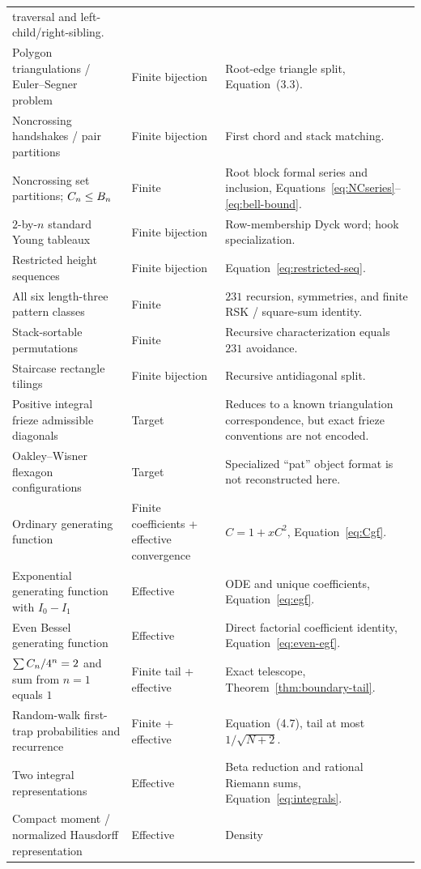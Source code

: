 \begin{longtable}{@{}p{}p{}p{}@{}}
traversal and left-child/right-sibling.\\
Polygon triangulations / Euler--Segner problem & Finite bijection & Root-edge
triangle split, Equation~(3.3).\\
Noncrossing handshakes / pair partitions & Finite bijection & First chord and
stack matching.\\
Noncrossing set partitions; $C_n\le B_n$ & Finite & Root block formal
series and inclusion, Equations~\eqref{eq:NCseries}--\eqref{eq:bell-bound}.\\
$2$-by-$n$ standard Young tableaux & Finite bijection & Row-membership Dyck
word; hook specialization.\\
Restricted height sequences & Finite bijection & Equation~\eqref{eq:restricted-seq}.\\
All six length-three pattern classes & Finite & $231$ recursion, symmetries,
and finite RSK / square-sum identity.\\
Stack-sortable permutations & Finite & Recursive characterization equals
$231$ avoidance.\\
Staircase rectangle tilings & Finite bijection & Recursive antidiagonal split.\\
Positive integral frieze admissible diagonals & Target & Reduces to a known
triangulation correspondence, but exact frieze conventions are not encoded.\\
Oakley--Wisner flexagon configurations & Target & Specialized ``pat'' object
format is not reconstructed here.\\
Ordinary generating function & Finite coefficients + effective convergence &
$C=1+xC^2$, Equation~\eqref{eq:Cgf}.\\
Exponential generating function with $I_0-I_1$ & Effective & ODE and unique
coefficients, Equation~\eqref{eq:egf}.\\
Even Bessel generating function & Effective & Direct factorial coefficient
identity, Equation~\eqref{eq:even-egf}.\\
$\sum C_n/4^n=2$ and sum from $n=1$ equals $1$ & Finite tail + effective &
Exact telescope, Theorem~\ref{thm:boundary-tail}.\\
Random-walk first-trap probabilities and recurrence & Finite + effective &
Equation~(4.7), tail at most $1/\sqrt{N+2}$.\\
Two integral representations & Effective & Beta reduction and rational
Riemann sums, Equation~\eqref{eq:integrals}.\\
Compact moment / normalized Hausdorff representation & Effective & Density

\end{longtable}
